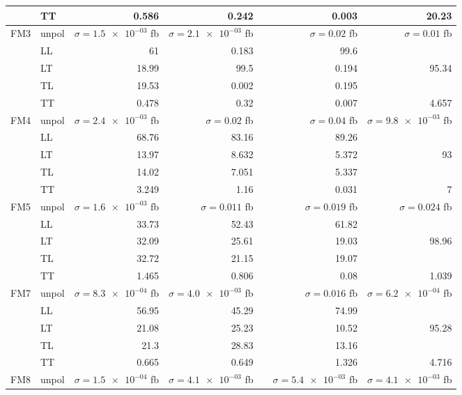 \begin{table}[h]
{\begin{tabular}{llrrrrr}
 & TT & \num{0.586} & \num{0.242} &  & \num{0.003} & \num{20.23} \\
\midrule
\multirow{5}{*}{FM3}
 & unpol & $\sigma = \num{1.5e-03}$ fb & $\sigma = \num{2.1e-03}$ fb &  & $\sigma = \num{0.02}$ fb & $\sigma = \num{0.01}$ fb \\
 & LL & \num{61} & \num{0.183} &  & \num{99.6} &  \\
 & LT & \num{18.99} & \num{99.5} &  & \num{0.194} & \num{95.34} \\
 & TL & \num{19.53} & \num{0.002} &  & \num{0.195} &  \\
 & TT & \num{0.478} & \num{0.32} &  & \num{0.007} & \num{4.657} \\
\midrule
\multirow{5}{*}{FM4}
 & unpol & $\sigma = \num{2.4e-03}$ fb & $\sigma = \num{0.02}$ fb &  & $\sigma = \num{0.04}$ fb & $\sigma = \num{9.8e-03}$ fb \\
 & LL & \num{68.76} & \num{83.16} &  & \num{89.26} &  \\
 & LT & \num{13.97} & \num{8.632} &  & \num{5.372} & \num{93} \\
 & TL & \num{14.02} & \num{7.051} &  & \num{5.337} &  \\
 & TT & \num{3.249} & \num{1.16} &  & \num{0.031} & \num{7} \\
\midrule
\multirow{5}{*}{FM5}
 & unpol & $\sigma = \num{1.6e-03}$ fb & $\sigma = \num{0.011}$ fb &  & $\sigma = \num{0.019}$ fb & $\sigma = \num{0.024}$ fb \\
 & LL & \num{33.73} & \num{52.43} &  & \num{61.82} &  \\
 & LT & \num{32.09} & \num{25.61} &  & \num{19.03} & \num{98.96} \\
 & TL & \num{32.72} & \num{21.15} &  & \num{19.07} &  \\
 & TT & \num{1.465} & \num{0.806} &  & \num{0.08} & \num{1.039} \\
\midrule
\multirow{5}{*}{FM7}
 & unpol & $\sigma = \num{8.3e-04}$ fb & $\sigma = \num{4.0e-03}$ fb &  & $\sigma = \num{0.016}$ fb & $\sigma = \num{6.2e-04}$ fb \\
 & LL & \num{56.95} & \num{45.29} &  & \num{74.99} &  \\
 & LT & \num{21.08} & \num{25.23} &  & \num{10.52} & \num{95.28} \\
 & TL & \num{21.3} & \num{28.83} &  & \num{13.16} &  \\
 & TT & \num{0.665} & \num{0.649} &  & \num{1.326} & \num{4.716} \\
\midrule
\multirow{5}{*}{FM8}
 & unpol & $\sigma = \num{1.5e-04}$ fb & $\sigma = \num{4.1e-03}$ fb &  & $\sigma = \num{5.4e-03}$ fb & $\sigma = \num{4.1e-03}$ fb \\

\end{tabular}}
\end{table}
